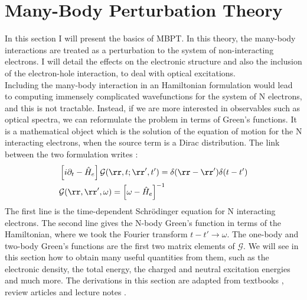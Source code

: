 %

\section{Many-Body Perturbation Theory}
In this section I will present the basics of \gls{MBPT}. In this theory, the many-body interactions are treated as a perturbation to the system of non-interacting electrons. I will detail the effects on the electronic structure and also the inclusion of the electron-hole interaction, to deal with optical excitations. \\
Including the many-body interaction in an Hamiltonian formulation would lead to computing immensely complicated wavefunctions for the system of N electrons, and this is not tractable. Instead, if we are more interested in observables such as optical spectra, we can reformulate the problem in terms of Green's functions. It is a mathematical object which is the solution of the equation of motion for the N interacting electrons, when the source term is a Dirac distribution. The link between the two formulation writes :
\begin{align}
\begin{split}
	&\left[ i \partial_t - \hat{H}_e \right] \mathcal{G}(\rr,t;\rr',t') = \delta(\rr-\rr')\delta(t-t') \\
	&\mathcal{G}(\rr,\rr',\omega) = \left[\omega - \hat{H}_e\right]^{-1}
\end{split}	
\end{align}
The first line is the time-dependent Schrödinger equation for N interacting electrons. The second line gives the N-body Green's function in terms of the Hamiltonian, where we took the Fourier transform $t-t' \to \omega$. The one-body and two-body Green's functions are the first two matrix elements of $\mathcal{G}$. We will see in this section how to obtain many useful quantities from them, such as the electronic density, the total energy, the charged and neutral excitation energies and much more. 
The derivations in this section are adapted from textbooks \cite{martin2016interacting,stefanucci2013nonequilibrium}, review articles \cite{strinati1988application,aryasetiawan1998gw,giustino2017review} and lecture notes \cite{JulienToulouseNotes}.

